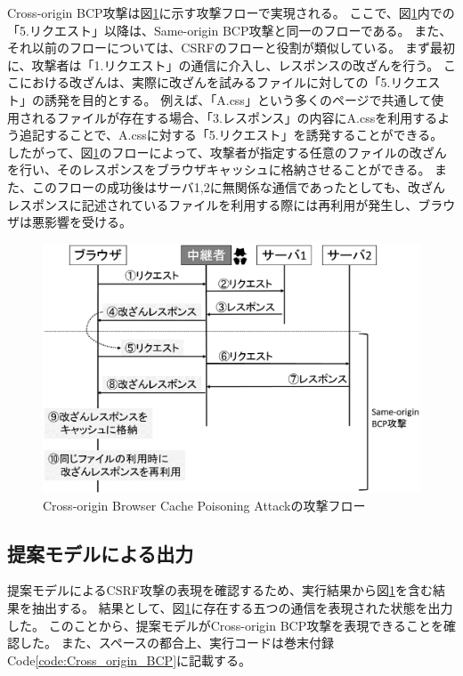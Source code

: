 \documentclass[12pt,a4paper]{jbook}
\begin{document}
Cross-origin BCP攻撃は図\ref{fig:CrossBCP_flow}に示す攻撃フローで実現される。
ここで、図\ref{fig:CrossBCP_flow}内での「5.リクエスト」以降は、Same-origin BCP攻撃と同一のフローである。
また、それ以前のフローについては、CSRFのフローと役割が類似している。
まず最初に、攻撃者は「1.リクエスト」の通信に介入し、レスポンスの改ざんを行う。
ここにおける改ざんは、実際に改ざんを試みるファイルに対しての「5.リクエスト」の誘発を目的とする。
例えば、「A.css」という多くのページで共通して使用されるファイルが存在する場合、「3.レスポンス」の内容にA.cssを利用するよう追記することで、A.cssに対する「5.リクエスト」を誘発することができる。
したがって、図\ref{fig:CrossBCP_flow}のフローによって、攻撃者が指定する任意のファイルの改ざんを行い、そのレスポンスをブラウザキャッシュに格納させることができる。
また、このフローの成功後はサーバ1,2に無関係な通信であったとしても、改ざんレスポンスに記述されているファイルを利用する際には再利用が発生し、ブラウザは悪影響を受ける。

\begin{figure}[htb]
\centering
\includegraphics[width=450pt]{./fig/CrossBCP_flow.eps}
\caption{Cross-origin Browser Cache Poisoning Attackの攻撃フロー}
\label{fig:CrossBCP_flow}
\end{figure}

\subsection{提案モデルによる出力}
提案モデルによるCSRF攻撃の表現を確認するため、実行結果から図\ref{fig:CrossBCP_flow}を含む結果を抽出する。
結果として、図\ref{fig:CrossBCP_flow}に存在する五つの通信を表現された状態を出力した。
このことから、提案モデルがCross-origin BCP攻撃を表現できることを確認した。
また、スペースの都合上、実行コードは巻末付録Code\ref{code:Cross_origin_BCP}に記載する。
\end{document}
